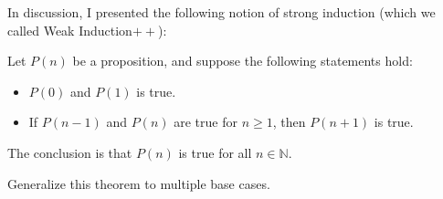 In discussion, I presented the following notion of strong induction (which we called Weak Induction$++$):
\begin{theorem}
Let $P(n)$ be a proposition, and suppose the following statements hold:
\begin{itemize}
    \item $P(0)$ and $P(1)$ is true.
    \item If $P(n-1)$ and $P(n)$ are true for $n \geq 1$, then $P(n + 1)$ is true.
\end{itemize}
The conclusion is that $P(n)$ is true for all $n \in \mathbb{N}$.
\end{theorem}

Generalize this theorem to multiple base cases.